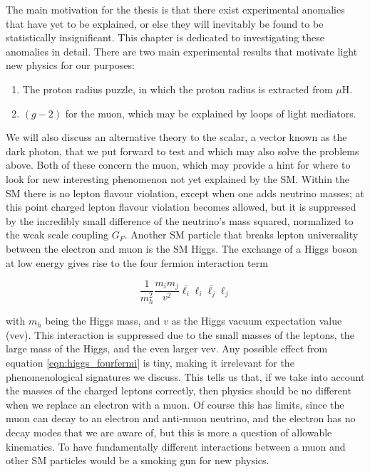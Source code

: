 \label{chapter:review}

The main motivation for the thesis is that there exist experimental anomalies that have yet to be explained, or else they will inevitably be found to be statistically insignificant.
This chapter is dedicated to investigating these anomalies in detail.
There are two main experimental results that motivate light new physics for our purposes:

\begin{enumerate}
    \item The proton radius puzzle, in which the proton radius is extracted from $\mu\textrm{H}$.
    \item $(g-2)$ for the muon, which may be explained by loops of light mediators.
\end{enumerate}

We will also discuss an alternative theory to the scalar, a vector known as the dark photon, that we put forward to test and which may also solve the problems above.
Both of these concern the muon, which may provide a hint for where to look for new interesting phenomenon not yet explained by the SM.
Within the SM there is no lepton flavour violation, except when one adds neutrino masses; at this point charged lepton flavour violation becomes allowed, but it is suppressed by the incredibly small difference of the neutrino's mass squared, normalized to the weak scale coupling $G_F$.
Another SM particle that breaks lepton universality between the electron and muon is the SM Higgs.
The exchange of a Higgs boson at low energy gives rise to the four fermion interaction term

\begin{equation}
\label{eqn:higgs_fourfermi}
\frac{1}{m_h^2} \frac{m_i m_j}{v^2} \bar{\ell_i} \ell_i \bar{\ell_j} \ell_j
\end{equation}

\noindent with $m_h$ being the Higgs mass, and $v$ as the Higgs vacuum expectation value (vev).
This interaction is suppressed due to the small masses of the leptons, the large mass of the Higgs, and the even larger vev.
Any possible effect from equation \ref{eqn:higgs_fourfermi} is tiny, making it irrelevant for the phenomenological signatures we discuss.
This tells us that, if we take into account the masses of the charged leptons correctly, then physics should be no different when we replace an electron with a muon.
Of course this has limits, since the muon can decay to an electron and anti-muon neutrino, and the electron has no decay modes that we are aware of, but this is more a question of allowable kinematics.
To have fundamentally different interactions between a muon and other SM particles would be a smoking gun for new physics.




